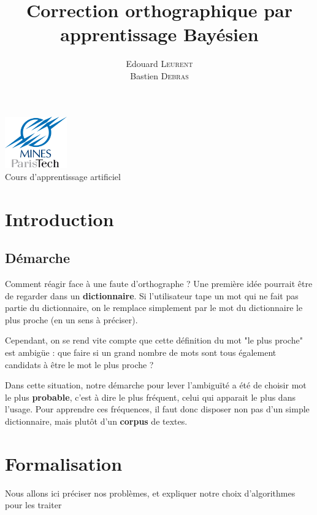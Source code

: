 \documentclass[10pt,a4paper]{article}
\title{Correction orthographique par apprentissage Bayésien}
\author{Edouard \textsc{Leurent} \\ Bastien \textsc{Debras}}
\begin{document}
\maketitle

\begin{center}
\includegraphics[width=0.2\textwidth]{logo_mines}\\ 
\Large{Cours d'apprentissage artificiel}
\end{center}
\setcounter{tocdepth}{3}
\tableofcontents
\vspace{5cm}

\newpage

\section{Introduction}
\subsection{Démarche}
Comment réagir face à une faute d'orthographe ? Une première idée pourrait être de regarder dans un \textbf{dictionnaire}. Si l'utilisateur tape un mot qui ne fait pas partie du dictionnaire, on le remplace simplement par le mot du dictionnaire le plus proche (en un sens à préciser). 

Cependant, on se rend vite compte que cette définition du mot "le plus proche" est ambigüe : que faire si un grand nombre de mots sont tous également candidats à être le mot le plus proche ?

Dans cette situation, notre démarche pour lever l'ambiguïté a été de choisir mot le plus \textbf{probable}, c'est à dire le plus fréquent, celui qui apparait le plus dans l'usage. Pour apprendre ces fréquences, il faut donc disposer non pas d'un simple dictionnaire, mais plutôt d'un \textbf{corpus} de textes.

\section{Formalisation}

Nous allons ici préciser nos problèmes, et expliquer notre choix d'algorithmes pour les traiter
\end{document}
